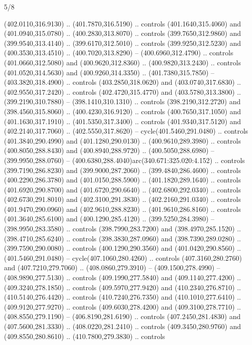 \begin{flagdescription}{5/8}
\begin{scope}[xshift=0.5\flaglength,yshift=0.5\flagwidth,scale=\flagwidth/475.63]
\begin{scope}[y=0.8pt, x=0.8pt, yscale=-1, xscale=1,shift={(-450,-300)}]
\begin{scope}[cm={{1.0,0.0,0.0,1.0,(-0.0002,0.12556)}},cm={{1.0,0.0,0.0,1.0,(0.00179,0.0)}}]
\begin{scope}[fill=c00863d]
  (402.0110,316.9130) .. (401.7870,316.5190) .. controls (401.1640,315.4060) and
  (401.0940,315.0780) .. (400.2830,313.8070) .. controls (399.7650,312.9860) and
  (399.9540,313.4140) .. (399.6170,312.5010) .. controls (399.9250,312.5230) and
  (400.3530,313.4510) .. (400.7020,313.8290) -- (400.6960,312.4790) .. controls
  (401.0660,312.5080) and (400.9620,312.8360) .. (400.9820,313.2430) .. controls
  (401.0520,314.5630) and (400.9260,314.3350) .. (401.7380,315.7850) --
  (403.3820,318.4900) .. controls (403.2850,318.0620) and (403.0740,317.6830) ..
  (402.9550,317.2420) .. controls (402.4720,315.4770) and (403.5780,313.3800) ..
  (399.2190,310.7880) -- (398.1410,310.1310) .. controls (398.2190,312.2720) and
  (398.4560,315.8060) .. (400.4230,316.9120) .. controls (400.7650,317.1050) and
  (401.1630,317.1910) .. (401.5350,317.3400) .. controls (401.9340,317.5120) and
  (402.2140,317.7060) .. (402.5550,317.8620) -- cycle(401.5460,291.0480) ..
  controls (401.3840,290.4990) and (401.1280,290.0130) .. (400.9610,289.3980) ..
  controls (400.8050,288.8430) and (400.8940,288.9720) .. (400.5050,288.6980) --
  (399.9950,288.0760) -- (400.6380,288.4040)arc(340.671:325.020:4.152) ..
  controls (399.7190,286.8230) and (399.9000,287.2060) .. (399.4840,286.4600) ..
  controls (400.2290,286.3780) and (401.0150,288.5900) .. (401.1820,289.1640) ..
  controls (401.6920,290.8700) and (401.6720,290.6640) .. (402.6800,292.0340) ..
  controls (402.6730,291.8010) and (402.3100,291.3830) .. (402.2160,291.0340) ..
  controls (401.9470,290.0960) and (402.9610,288.8230) .. (401.9610,286.8160) ..
  controls (401.3640,285.6100) and (400.1290,285.4120) .. (399.5250,284.3980) --
  (398.9950,283.3580) .. controls (398.7990,283.7200) and (398.4970,285.1520) ..
  (398.4710,285.6240) .. controls (398.3830,287.0960) and (398.7390,289.0280) ..
  (399.7590,290.0080) .. controls (400.1290,290.3560) and (401.0420,290.8560) ..
  (401.5460,291.0480) -- cycle(407.1060,280.4260) .. controls
  (407.3160,280.2760) and (407.7210,279.7060) .. (408.0860,279.3910) --
  (409.1500,278.4990) -- (408.9890,277.5130) .. controls (409.1990,277.5840) and
  (409.1140,277.4200) .. (409.3240,278.1850) .. controls (409.5970,277.9420) and
  (410.2340,276.8710) .. (410.5140,276.4420) .. controls (410.7240,276.7350) and
  (410.1010,277.6410) .. (409.9120,277.9270) .. controls (409.6030,278.4200) and
  (409.3100,278.7710) .. (408.8550,279.1190) -- (406.8190,281.6190) .. controls
  (407.2450,281.4830) and (407.5600,281.3330) .. (408.0220,281.2410) .. controls
  (409.3450,280.9760) and (409.8550,280.8610) .. (410.7800,279.3830) .. controls

\end{scope}
\end{scope}
\end{scope}
\end{scope}
\end{flagdescription}
